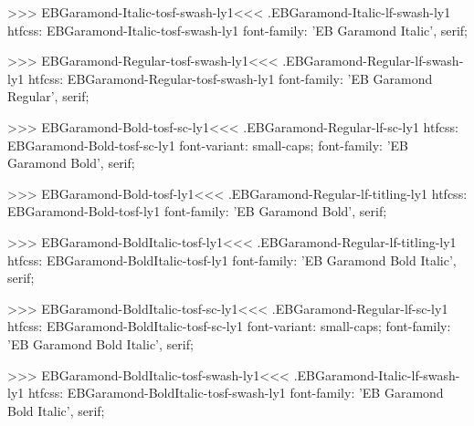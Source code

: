 {{>>>
\<EBGaramond-Italic-tosf-swash-ly1\><<<
.EBGaramond-Italic-lf-swash-ly1
htfcss:  EBGaramond-Italic-tosf-swash-ly1  font-family: 'EB Garamond Italic', serif;

>>>
\<EBGaramond-Regular-tosf-swash-ly1\><<<
.EBGaramond-Regular-lf-swash-ly1
htfcss:  EBGaramond-Regular-tosf-swash-ly1  font-family: 'EB Garamond Regular', serif;

>>>
\<EBGaramond-Bold-tosf-sc-ly1\><<<
.EBGaramond-Regular-lf-sc-ly1
htfcss:  EBGaramond-Bold-tosf-sc-ly1  font-variant: small-caps; font-family: 'EB Garamond Bold', serif;

>>>
\<EBGaramond-Bold-tosf-ly1\><<<
.EBGaramond-Regular-lf-titling-ly1
htfcss:  EBGaramond-Bold-tosf-ly1  font-family: 'EB Garamond Bold', serif;

>>>
\<EBGaramond-BoldItalic-tosf-ly1\><<<
.EBGaramond-Regular-lf-titling-ly1
htfcss:  EBGaramond-BoldItalic-tosf-ly1  font-family: 'EB Garamond Bold Italic', serif;

>>>
\<EBGaramond-BoldItalic-tosf-sc-ly1\><<<
.EBGaramond-Regular-lf-sc-ly1
htfcss:  EBGaramond-BoldItalic-tosf-sc-ly1  font-variant: small-caps; font-family: 'EB Garamond Bold Italic', serif;

>>>
\<EBGaramond-BoldItalic-tosf-swash-ly1\><<<
.EBGaramond-Italic-lf-swash-ly1
htfcss:  EBGaramond-BoldItalic-tosf-swash-ly1  font-family: 'EB Garamond Bold Italic', serif;

}}
